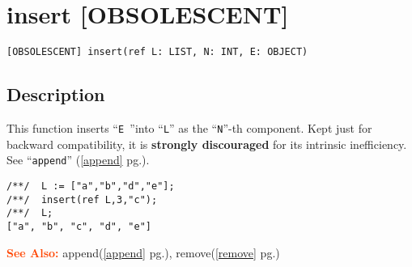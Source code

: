 \documentclass[a4paper]{mybook}
\newenvironment{command}{}{} %
\newcommand\SeeAlso{\par\textcolor{OrangeRed}{\textbf{\large See Also: }}}
\begin{document}
\section{insert [OBSOLESCENT]}
\label{insert [OBSOLESCENT]}
\begin{command} %


\begin{Verbatim}[label=syntax, rulecolor=\color{MidnightBlue},
frame=single]
[OBSOLESCENT] insert(ref L: LIST, N: INT, E: OBJECT)
\end{Verbatim}


\subsection*{Description}

This function inserts ``\verb&E &''into ``\verb&L&'' as the ``\verb&N&''-th component.
Kept just for backward compatibility, it is \textbf{strongly discouraged} for its
intrinsic inefficiency.  See ``\verb&append&'' (\ref{append} pg.\pageref{append}).
\begin{Verbatim}[label=example, rulecolor=\color{PineGreen}, frame=single]
/**/  L := ["a","b","d","e"];
/**/  insert(ref L,3,"c");
/**/  L;
["a", "b", "c", "d", "e"]
\end{Verbatim}


\SeeAlso %
  append(\ref{append} pg.\pageref{append}), 
    remove(\ref{remove} pg.\pageref{remove})
\end{command} %
\end{document}
